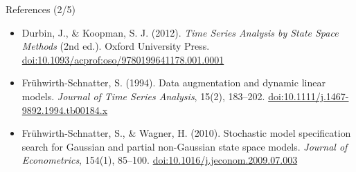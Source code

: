 \begin{frame}{References (2/5)}
\begin{itemize}
    \item Durbin, J., \& Koopman, S. J. (2012). \textit{Time Series Analysis by State Space Methods} (2nd ed.). Oxford University Press. \href{https://doi.org/10.1093/acprof:oso/9780199641178.001.0001}{doi:10.1093/acprof:oso/9780199641178.001.0001}
    \item Frühwirth-Schnatter, S. (1994). Data augmentation and dynamic linear models. \textit{Journal of Time Series Analysis}, 15(2), 183--202. \href{https://doi.org/10.1111/j.1467-9892.1994.tb00184.x}{doi:10.1111/j.1467-9892.1994.tb00184.x}
    \item Frühwirth-Schnatter, S., \& Wagner, H. (2010). Stochastic model specification search for Gaussian and partial non-Gaussian state space models. \textit{Journal of Econometrics}, 154(1), 85--100. \href{https://doi.org/10.1016/j.jeconom.2009.07.003}{doi:10.1016/j.jeconom.2009.07.003}
\end{itemize}
\end{frame}

